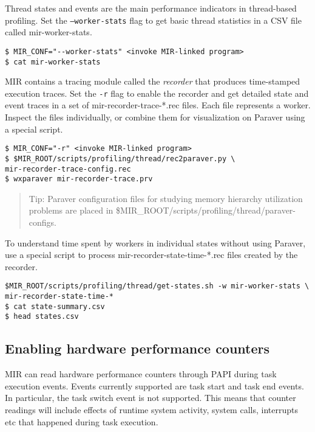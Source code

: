 \documentclass[11pt,a4paper]{article}
\begin{document}
Thread states and events are the main performance indicators in thread-based profiling.
Set the \texttt{--worker-stats} flag to get basic thread statistics in a CSV file called \textsf{mir-worker-stats}.

\begin{lstlisting}[style=MyInputStyle]
$ MIR_CONF="--worker-stats" <invoke MIR-linked program>
$ cat mir-worker-stats
\end{lstlisting}

MIR contains a tracing module called the \textit{recorder} that produces time-stamped execution traces. Set the \texttt{-r} flag to enable the recorder and get detailed state and event traces in a set of \textsf{mir-recorder-trace-*.rec} files.  Each file represents a worker. Inspect the files individually, or combine them for visualization on Paraver using a special script.

\begin{lstlisting}[style=MyInputStyle]
$ MIR_CONF="-r" <invoke MIR-linked program>
$ $MIR_ROOT/scripts/profiling/thread/rec2paraver.py \
mir-recorder-trace-config.rec
$ wxparaver mir-recorder-trace.prv
\end{lstlisting}

\begin{framed}
\begin{quote}
Tip: Paraver configuration files for studying memory hierarchy utilization problems are placed in \textsf{\$MIR\_ROOT/scripts/profiling/thread/paraver-configs}.
\end{quote}
\end{framed}

To understand time spent by workers in individual states without using Paraver, use a special script to process \textsf{mir-recorder-state-time-*.rec} files created by the recorder.

\begin{lstlisting}[style=MyInputStyle]
$MIR_ROOT/scripts/profiling/thread/get-states.sh -w mir-worker-stats \
mir-recorder-state-time-*
$ cat state-summary.csv
$ head states.csv
\end{lstlisting}

\subsection{Enabling hardware performance counters}\label{sec:enabling-hardware-performance-counters}

MIR can read hardware performance counters through PAPI during task execution events. Events currently supported are task start and task end events.
In particular, the task switch event is not supported.
This means that counter readings will include effects of runtime system activity, system calls, interrupts etc that happened during task execution.
\end{document}
